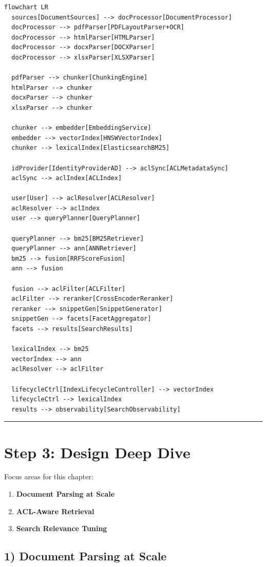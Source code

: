 \begin{verbatim}
flowchart LR
  sources[DocumentSources] --> docProcessor[DocumentProcessor]
  docProcessor --> pdfParser[PDFLayoutParser+OCR]
  docProcessor --> htmlParser[HTMLParser]
  docProcessor --> docxParser[DOCXParser]
  docProcessor --> xlsxParser[XLSXParser]

  pdfParser --> chunker[ChunkingEngine]
  htmlParser --> chunker
  docxParser --> chunker
  xlsxParser --> chunker

  chunker --> embedder[EmbeddingService]
  embedder --> vectorIndex[HNSWVectorIndex]
  chunker --> lexicalIndex[ElasticsearchBM25]

  idProvider[IdentityProviderAD] --> aclSync[ACLMetadataSync]
  aclSync --> aclIndex[ACLIndex]

  user[User] --> aclResolver[ACLResolver]
  aclResolver --> aclIndex
  user --> queryPlanner[QueryPlanner]

  queryPlanner --> bm25[BM25Retriever]
  queryPlanner --> ann[ANNRetriever]
  bm25 --> fusion[RRFScoreFusion]
  ann --> fusion

  fusion --> aclFilter[ACLFilter]
  aclFilter --> reranker[CrossEncoderReranker]
  reranker --> snippetGen[SnippetGenerator]
  snippetGen --> facets[FacetAggregator]
  facets --> results[SearchResults]

  lexicalIndex --> bm25
  vectorIndex --> ann
  aclResolver --> aclFilter

  lifecycleCtrl[IndexLifecycleController] --> vectorIndex
  lifecycleCtrl --> lexicalIndex
  results --> observability[SearchObservability]
\end{verbatim}

\bigskip\hrule\bigskip

\section*{Step 3: Design Deep Dive}

Focus areas for this chapter:

\begin{enumerate}
  \item \textbf{Document Parsing at Scale}
  \item \textbf{ACL-Aware Retrieval}
  \item \textbf{Search Relevance Tuning}
\end{enumerate}

\subsection*{1) Document Parsing at Scale}

